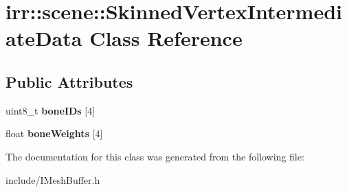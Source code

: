 \hypertarget{classirr_1_1scene_1_1SkinnedVertexIntermediateData}{}\section{irr\+:\+:scene\+:\+:Skinned\+Vertex\+Intermediate\+Data Class Reference}
\label{classirr_1_1scene_1_1SkinnedVertexIntermediateData}
\subsection*{Public Attributes}
\begin{DoxyCompactItemize}
\item 
uint8\+\_\+t {\bfseries bone\+I\+Ds} \mbox{[}4\mbox{]}\hypertarget{classirr_1_1scene_1_1SkinnedVertexIntermediateData_a29281f903e842e237b1e16bbe6811d32}{}\label{classirr_1_1scene_1_1SkinnedVertexIntermediateData_a29281f903e842e237b1e16bbe6811d32}

\item 
float {\bfseries bone\+Weights} \mbox{[}4\mbox{]}\hypertarget{classirr_1_1scene_1_1SkinnedVertexIntermediateData_aeb7d732f1e2c0156b927bba1eb2ee1e0}{}\label{classirr_1_1scene_1_1SkinnedVertexIntermediateData_aeb7d732f1e2c0156b927bba1eb2ee1e0}

\end{DoxyCompactItemize}


The documentation for this class was generated from the following file\+:\begin{DoxyCompactItemize}
\item 
include/I\+Mesh\+Buffer.\+h\end{DoxyCompactItemize}
